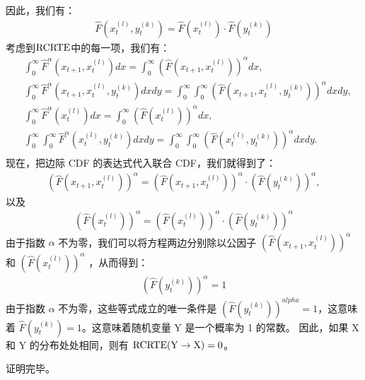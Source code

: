 因此，我们有：
\begin{align*}
\hat F(x_{t}^{(l)},y_{t}^{(k)}) = \hat F(x_{t}^{(l)}) \cdot \hat F(y_{t}^{(k)})
\end{align*}
考虑到$\rm{RCRTE}$中的每一项，我们有：
\begin{align*}
&\int_{0}^{\infty}\hat F^{\alpha}(x_{t+1},x_{t}^{(l)})dx = \int_{0}^{\infty}(\hat F(x_{t+1},x_{t}^{(l)}))^{\alpha}dx,\\
&\int_{0}^{\infty}\hat F^{\alpha}(x_{t+1},x_{t}^{(l)},y_{t}^{(k)})dxdy = \int_{0}^{\infty}\int_{0}^{\infty}(\hat F(x_{t+1},x_{t}^{(l)},y_{t}^{(k)}))^{\alpha}dxdy,\\
&\int_{0}^{\infty}\hat F^{\alpha}(x_{t}^{(l)})dx = \int_{0}^{\infty}(\hat F(x_{t}^{(l)}))^{\alpha}dx,\\
&\int_{0}^{\infty}\int_{0}^{\infty}\hat F^{\alpha}(x_{t}^{(l)},y_{t}^{(k)})dxdy = \int_{0}^{\infty}\int_{0}^{\infty}(\hat F(x_{t}^{(l)},y_{t}^{(k)}))^{\alpha}dxdy.\\
\end{align*}
现在，把边际 CDF 的表达式代入联合 CDF，我们就得到了：
\begin{align*}
(\hat F(x_{t+1},x_{t}^{(l)}))^{\alpha} = (\hat F(x_{t+1},x_{t}^{(l)}))^{\alpha} \cdot (\hat F(y_{t}^{(k)}))^{\alpha},
\end{align*}
以及
\begin{align*}
(\hat F(x_{t}^{(l)}))^{\alpha} = (\hat F(x_{t}^{(l)}))^{\alpha} \cdot (\hat F(y_{t}^{(k)}))^{\alpha}
\end{align*}
由于指数 $\alpha$ 不为零，我们可以将方程两边分别除以公因子 $(\hat F(x_{t+1},x_{t}^{(l)}))^{\alpha}$ 和 $(\hat F(x_{t}^{(l)}))^{\alpha}$ ，从而得到：
\begin{align*}
(\hat F(y_{t}^{(k)}))^{\alpha} = 1
\end{align*}
由于指数 $\alpha$ 不为零，这些等式成立的唯一条件是 $(\hat F(y_{t}^{(k)}))^{alpha} = 1$，这意味着 $\hat F(y_{t}^{(k)}) = 1$。这意味着随机变量 Y 是一个概率为 1 的常数。
因此，如果 X 和 Y 的分布处处相同，则有 $\rm{RCRTE}(Y \rightarrow X) = 0$。

证明完毕。\\

